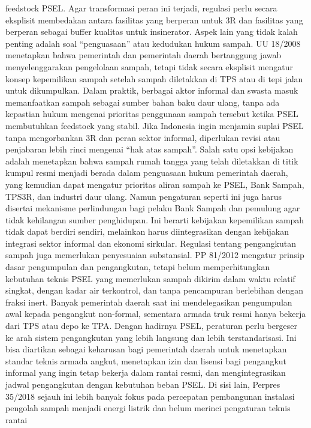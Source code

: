 \documentclass[
  letterpaper,
  DIV=11,
  numbers=noendperiod]{scrreprt}
\begin{document}
feedstock PSEL. Agar transformasi peran ini terjadi, regulasi perlu
secara eksplisit membedakan antara fasilitas yang berperan untuk 3R dan
fasilitas yang berperan sebagai buffer kualitas untuk insinerator. Aspek
lain yang tidak kalah penting adalah soal ``penguasaan'' atau kedudukan
hukum sampah. UU 18/2008 menetapkan bahwa pemerintah dan pemerintah
daerah bertanggung jawab menyelenggarakan pengelolaan sampah, tetapi
tidak secara eksplisit mengatur konsep kepemilikan sampah setelah sampah
diletakkan di TPS atau di tepi jalan untuk dikumpulkan. Dalam praktik,
berbagai aktor informal dan swasta masuk memanfaatkan sampah sebagai
sumber bahan baku daur ulang, tanpa ada kepastian hukum mengenai
prioritas penggunaan sampah tersebut ketika PSEL membutuhkan feedstock
yang stabil. Jika Indonesia ingin menjamin suplai PSEL tanpa
mengorbankan 3R dan peran sektor informal, diperlukan revisi atau
penjabaran lebih rinci mengenai ``hak atas sampah''. Salah satu opsi
kebijakan adalah menetapkan bahwa sampah rumah tangga yang telah
diletakkan di titik kumpul resmi menjadi berada dalam penguasaan hukum
pemerintah daerah, yang kemudian dapat mengatur prioritas aliran sampah
ke PSEL, Bank Sampah, TPS3R, dan industri daur ulang. Namun pengaturan
seperti ini juga harus disertai mekanisme perlindungan bagi pelaku Bank
Sampah dan pemulung agar tidak kehilangan sumber penghidupan. Ini
berarti kebijakan kepemilikan sampah tidak dapat berdiri sendiri,
melainkan harus diintegrasikan dengan kebijakan integrasi sektor
informal dan ekonomi sirkular. Regulasi tentang pengangkutan sampah juga
memerlukan penyesuaian substansial. PP 81/2012 mengatur prinsip dasar
pengumpulan dan pengangkutan, tetapi belum memperhitungkan kebutuhan
teknis PSEL yang memerlukan sampah dikirim dalam waktu relatif singkat,
dengan kadar air terkontrol, dan tanpa pencampuran berlebihan dengan
fraksi inert. Banyak pemerintah daerah saat ini mendelegasikan
pengumpulan awal kepada pengangkut non-formal, sementara armada truk
resmi hanya bekerja dari TPS atau depo ke TPA. Dengan hadirnya PSEL,
peraturan perlu bergeser ke arah sistem pengangkutan yang lebih langsung
dan lebih terstandarisasi. Ini bisa diartikan sebagai keharusan bagi
pemerintah daerah untuk menetapkan standar teknis armada angkut,
menetapkan izin dan lisensi bagi pengangkut informal yang ingin tetap
bekerja dalam rantai resmi, dan mengintegrasikan jadwal pengangkutan
dengan kebutuhan beban PSEL. Di sisi lain, Perpres 35/2018 sejauh ini
lebih banyak fokus pada percepatan pembangunan instalasi pengolah sampah
menjadi energi listrik dan belum merinci pengaturan teknis rantai
\end{document}
